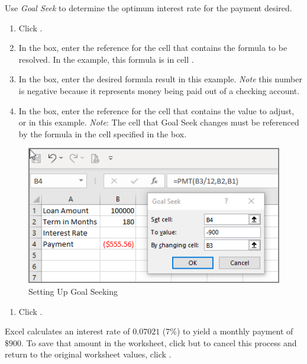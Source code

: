Use \textit{Goal Seek} to determine the optimum interest rate for the payment desired.

\begin{enumerate}
	\item Click .
	\item In the  box, enter the reference for the cell that contains the formula to be resolved. In the example, this formula is in cell .
	\item In the  box, enter the desired formula result  in this example. \textit{Note} this number is negative because it represents money being paid out of a checking account.
	\item In the  box, enter the reference for the cell that contains the value to adjust, or  in this example. \textit{Note}: The cell that Goal Seek changes must be referenced by the formula in the cell specified in the  box.
	
\end{enumerate}

\begin{figure}[H]
	\centering
	\includegraphics[width=\maxwidth{.95\linewidth}]{gfx/ch08_fig33}
	\caption{Setting Up Goal Seeking}
	\label{08:fig33}
\end{figure}

\begin{enumerate}[resume]	
	\item Click .
\end{enumerate}

Excel calculates an interest rate of $ 0.07021 $ ($ 7\% $) to yield a monthly payment of $ \$900 $. To save that amount in the worksheet, click  but to cancel this process and return to the original worksheet values, click .

